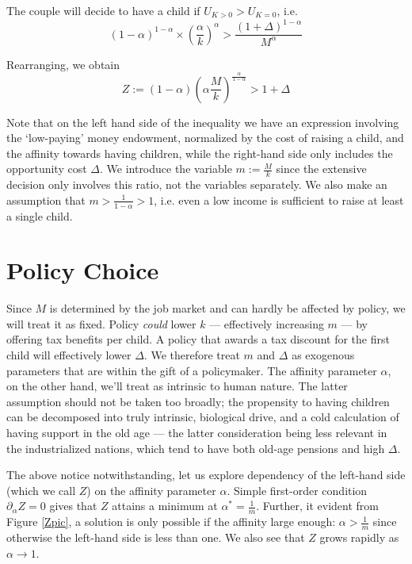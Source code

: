 \documentclass{homework}
\begin{document}
The couple will decide to have a child if $U_{K>0} > U_{K=0}$, i.e.
\[ (1-\alpha)^{1-\alpha}\times\left(\frac{\alpha}{k}\right)^\alpha > \frac{(1+\Delta)^{1-\alpha}}{M^\alpha} \]

Rearranging, we obtain \begin{equation}
Z := (1-\alpha)\left(\alpha\frac{M}{k}\right)^\frac{\alpha}{1-\alpha} > 1+\Delta
\end{equation}

Note that on the left hand side of the inequality we have an expression involving the `low-paying' money endowment, normalized by the cost of raising a child, and the affinity towards having children, while the right-hand side only includes the opportunity cost $\Delta$. We introduce the variable $m:=\frac{M}{k}$ since the extensive decision only involves this ratio, not the variables separately. We also make an assumption that $m>\frac{1}{1-\alpha}>1$, i.e. even a low income is sufficient to raise at least a single child.

\section{Policy Choice}

Since $M$ is determined by the job market and can hardly be affected by policy, we will treat it as fixed. Policy \emph{could} lower $k$ --- effectively increasing $m$ --- by offering tax benefits per child. A policy that awards a tax discount for the first child will effectively lower $\Delta$. We therefore treat $m$ and $\Delta$ as exogenous parameters that are within the gift of a policymaker. The affinity parameter $\alpha$, on the other hand, we'll treat as intrinsic to human nature. The latter assumption should not be taken too broadly; the propensity to having children can be decomposed into truly intrinsic, biological drive, and a cold calculation of having support in the old age --- the latter consideration being less relevant in the industrialized nations, which tend to have both old-age pensions and high $\Delta$.

The above notice notwithstanding, let us explore dependency of the left-hand side (which we call $Z$) on the affinity parameter $\alpha$. Simple first-order condition $\partial_\alpha Z=0$ gives that $Z$ attains a minimum at $\alpha^* = \frac{1}{m}$. Further, it evident from Figure \ref{Zpic}, a solution is only possible if the affinity large enough: $\alpha > \frac{1}{m}$ since otherwise the left-hand side is less than one. We also see that $Z$ grows rapidly as $\alpha\to1$.
\end{document}
